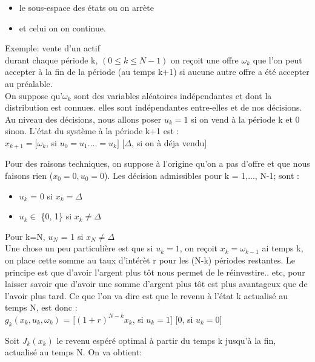 \documentclass[oneside]{book}
\begin{document}
\begin{itemize}
\item le sous-espace des états ou on arrète
\item et celui on on continue.
\end{itemize}

Exemple: vente d'un actif\\

durant chaque période k, $(0 \leq k \leq N-1)$ on reçoit une offre $\omega_k$ que l'on peut accepter à la fin de la période (au temps k+1) si aucune autre offre a été accepter au préalable.\\

On suppose qu'$\omega_k$ sont des variables aléatoires indépendantes et dont la distribution est connues. elles sont indépendantes entre-elles et de nos décisions. Au niveau des décisions, nous allons poser $u_k = 1$ si on vend à la période k et 0 sinon. L'état du système à la période k+1 est :\\

\center
$x_{k + 1} = [\omega_k $, si $u_0 = u_1 .... = u_k] $  $[\Delta$, si on à déja vendu$]$ 
\justify

Pour des raisons techniques, on suppose à l'origine qu'on a pas d'offre et que nous faisons rien ($x_0 = 0, u_0 = 0$). Les décision admissibles pour k = 1,..., N-1; sont :\\

\begin{itemize}
\item $u_k$ = 0 si $x_k = \Delta$
\item $u_k \in$ \{0, 1\} si $x_k \neq \Delta$
\end{itemize} 
\justify
Pour k=N, $u_N$ = 1 si $x_N \neq \Delta$\\

Une chose un peu particulière est que si $u_k = 1$, on reçoit $x_k = \omega_{k-1}$ ai temps k, on place cette somme au taux d'intérèt r pour les (N-k) périodes restantes. Le principe est que d'avoir l'argent plus tôt nous permet de le réinvestire.. etc, pour laisser savoir que d'avoir une somme d'argent plus tôt est plus avantageux que de l'avoir plus tard. Ce que l'on va dire est que le revenu à l'état k actualisé au temps N, est donc :\\


\centering
$g_k(x_k,u_k, \omega_k)$ =  $[(1+r)^{N-k}x_k $, si  $ u_k = 1]$ $[0 $, si $u_k = 0]$\\
\justify

Soit $J_k(x_k)$ le revenu espéré optimal à partir du temps k jusqu'à la fin, actualisé au temps N. On va obtient:\\
\end{document}
